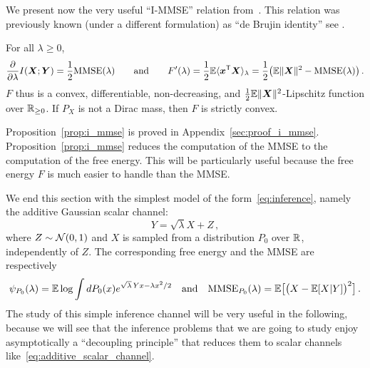 \documentclass[12pt,nocut]{article}
\begin{document}
We present now the very useful ``I-MMSE'' relation from~\cite{guo2005mutual}. This relation was previously known (under a different formulation) as ``de Brujin identity'' see \cite[Equation 2.12]{stam1959some}.
\begin{proposition}\label{prop:i_mmse}
	For all $\lambda \geq 0$,
	\begin{equation}\label{eq:i_mmse}
		\frac{\partial}{\partial \lambda} I({\boldsymbol X};{\boldsymbol Y}) = \frac{1}{2} {{\rm MMSE}}(\lambda)
		\qquad \text{and} \qquad
		F'(\lambda) = \frac{1}{2} \mathbb{E} \langle {\boldsymbol x}^{{\sf T}} {\boldsymbol X} \rangle_{\lambda} 
		= \frac{1}{2} \big(\mathbb{E} \| {\boldsymbol X}\|^2 - {{\rm MMSE}}(\lambda) \big)
		\,.
	\end{equation}
	$F$ thus is a convex, differentiable, non-decreasing, and $\frac{1}{2}\mathbb{E}\|{\boldsymbol X}\|^2$-Lipschitz function over $\mathbb{R}_{\geq 0}$. If $P_X$ is not a Dirac mass, then $F$ is strictly convex.
\end{proposition}
Proposition~\ref{prop:i_mmse} is proved in Appendix~\ref{sec:proof_i_mmse}.
Proposition~\ref{prop:i_mmse} reduces the computation of the MMSE to the computation of the free energy. This will be particularly useful because the free energy $F$ is much easier to handle than the MMSE.

We end this section with the simplest model of the form~\eqref{eq:inference}, namely the additive Gaussian scalar channel:
\begin{equation}\label{eq:additive_scalar_channel}
	Y = \sqrt{\lambda} X + Z \,,
\end{equation}
where $Z \sim \mathcal{N}(0,1)$ and $X$ is sampled from a distribution $P_0$ over $\mathbb{R}$, independently of $Z$. The corresponding free energy and the MMSE are respectively
	\begin{equation}\label{eq:def_psi_p0}
		\psi_{P_0}(\lambda)= \mathbb{E} \log \int dP_0(x)e^{\sqrt{\lambda} \,Y x - \lambda x^2/2}
		\quad \text{and} \quad {{\rm MMSE}}_{P_0}(\lambda) = \mathbb{E} \big[\big(X - \mathbb{E}[X|Y]\big)^2\big] \,.
	\end{equation}
The study of this simple inference channel will be very useful in the following, because we will see that the inference problems that we are going to study enjoy asymptotically a ``decoupling principle'' that reduces them to scalar channels like~\eqref{eq:additive_scalar_channel}.
\end{document}
